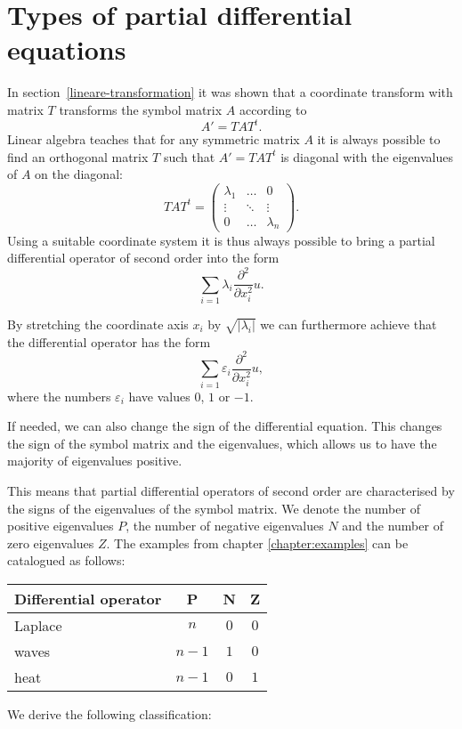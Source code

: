 %
%
%
\section{Types of partial differential equations}
In section~\ref{lineare-transformation}
it was shown that a coordinate transform with matrix $T$ transforms
the symbol matrix $A$ according to
\[
A'=TAT^t .
\]
Linear algebra teaches that for any symmetric matrix $A$ it is always possible 
to find an orthogonal matrix $T$ such that $A'=TAT^t$ is diagonal with
the eigenvalues of $A$ on the diagonal:
\[
TAT^t
=
\begin{pmatrix}\lambda_1&\dots&0\\
\vdots&\ddots&\vdots\\
0&\dots&\lambda_n
\end{pmatrix}.
\]
Using a suitable coordinate system it is thus always possible to 
bring a partial differential operator of second order into the form
\[
\sum_{i=1}\lambda_i\frac{\partial^2}{\partial x_i^2}u.
\]

By stretching the coordinate axis $x_i$ by 
$\sqrt{|\lambda_i|}$
we can furthermore achieve that the differential operator
has the form
\[
\sum_{i=1}\varepsilon_i\frac{\partial^2}{\partial x_i^2}u,
\]
where the numbers $\varepsilon_i$ have values $0$, $1$ or $-1$.

If needed, we can also change the sign of the differential equation.
This changes the sign of the symbol matrix and the eigenvalues, which
allows us to have the majority of eigenvalues positive.

This means that partial differential operators of second order are
characterised by the signs of the eigenvalues of the symbol matrix.
We denote the number of positive eigenvalues $P$, the number of negative
eigenvalues $N$ and the number of zero eigenvalues $Z$.
The examples from chapter \ref{chapter:examples}
can be catalogued as follows:
\begin{center}
\begin{tabular}{l|ccc}
Differential operator&P&N&Z
\\
\hline
Laplace&
$n$&$0$&$0$
\\
waves&
$n-1$&$1$&$0$
\\
heat&
$n-1$&$0$&$1$
\end{tabular}
\end{center}
We derive the following classification:

